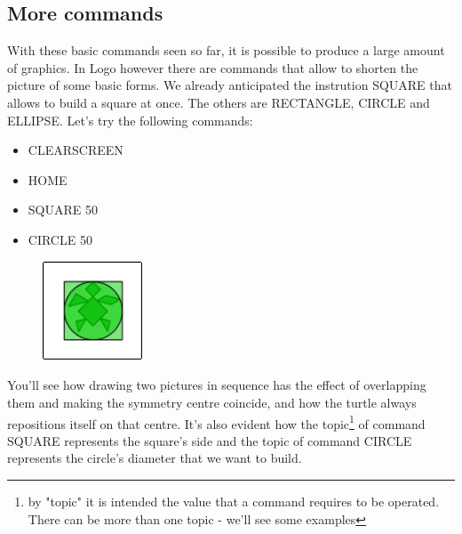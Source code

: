 \subsection{More commands}

With these basic commands seen so far, it is possible to produce a large amount of graphics. In Logo however there are commands that allow to shorten the picture of some basic forms. We already anticipated the instrution SQUARE that allows to build a square at once. The others are RECTANGLE, CIRCLE and ELLIPSE.
Let's try the following commands:

\vskip 1cm

\begin{scriptsize}
\begin{scriptsize}
\begin{minipage}{0.40\textwidth}
\begin{itemize}[itemsep=-3pt,parsep=2pt]
\item[] CLEARSCREEN
\item[] HOME
\item[] SQUARE 50                               
\item[] CIRCLE 50                                       
\end{itemize}
\end{minipage}
\end{scriptsize}
\end{scriptsize}
\begin{minipage}{0.4\textwidth}
\begin{figure}[H]
   \includegraphics[width=3.0cm,trim=4 4 8 4,clip]{./images/disegnare/disegnare-20.png}
   \label{dis-19}
\end{figure}
\end{minipage} \hfill

\vskip 1cm

You'll see how drawing two pictures in sequence has the effect of overlapping them and making the symmetry centre coincide, and how the turtle always repositions itself on that centre. It’s also evident how the topic\footnote {by "topic" it is intended the value that a command requires to be operated. There can be more than one topic - we'll see some examples} of command SQUARE represents the square's side and the topic of command CIRCLE represents the circle's diameter that we want to build.


